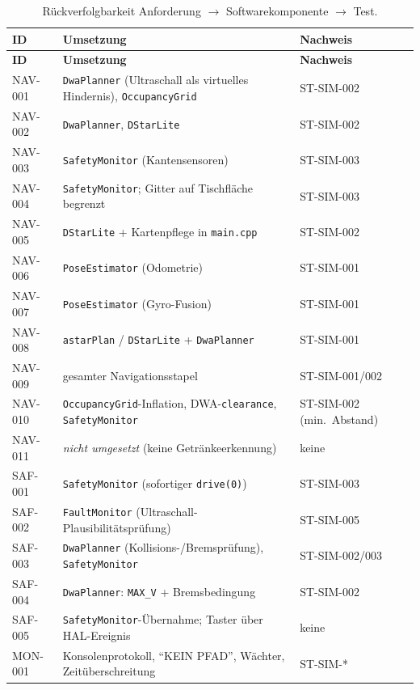 \documentclass[
  a4paper,
  12pt,
  DIV=12,        %
  parskip=half,  %
  headings=small %
]{scrartcl}
\theoremstyle{definition}
\theoremstyle{definition}
\begin{document}
\begin{longtable}[]{@{}
  >{\raggedright\arraybackslash}p{}
  >{\raggedright\arraybackslash}p{}
  >{\raggedright\arraybackslash}p{}@{}}
\caption{Rückverfolgbarkeit Anforderung $\rightarrow$ Softwarekomponente $\rightarrow$ Test.}
\label{tab:trace}\\
\toprule
\textbf{ID} & \textbf{Umsetzung} & \textbf{Nachweis}\\
\midrule
\endfirsthead
\toprule
\textbf{ID} & \textbf{Umsetzung} & \textbf{Nachweis}\\
\midrule
\endhead
\bottomrule
\endfoot
NAV-001 & \texttt{DwaPlanner} (Ultraschall als virtuelles Hindernis), \texttt{OccupancyGrid} & ST-SIM-002\\
NAV-002 & \texttt{DwaPlanner}, \texttt{DStarLite} & ST-SIM-002\\
NAV-003 & \texttt{SafetyMonitor} (Kantensensoren) & ST-SIM-003\\
NAV-004 & \texttt{SafetyMonitor}; Gitter auf Tischfläche begrenzt & ST-SIM-003\\
NAV-005 & \texttt{DStarLite} + Kartenpflege in \texttt{main.cpp} & ST-SIM-002\\
NAV-006 & \texttt{PoseEstimator} (Odometrie) & ST-SIM-001\\
NAV-007 & \texttt{PoseEstimator} (Gyro-Fusion) & ST-SIM-001\\
NAV-008 & \texttt{astarPlan} / \texttt{DStarLite} + \texttt{DwaPlanner} & ST-SIM-001\\
NAV-009 & gesamter Navigationsstapel & ST-SIM-001/002\\
NAV-010 & \texttt{OccupancyGrid}-Inflation, DWA-\texttt{clearance}, \texttt{SafetyMonitor} & ST-SIM-002 (min.\ Abstand)\\
NAV-011 & \emph{nicht umgesetzt} (keine Getränkeerkennung) & keine\\
SAF-001 & \texttt{SafetyMonitor} (sofortiger \texttt{drive(0)}) & ST-SIM-003\\
SAF-002 & \texttt{FaultMonitor} (Ultraschall-Plausibilitätsprüfung) & ST-SIM-005\\
SAF-003 & \texttt{DwaPlanner} (Kollisions-/Bremsprüfung), \texttt{SafetyMonitor} & ST-SIM-002/003\\
SAF-004 & \texttt{DwaPlanner}: \texttt{MAX\_V} + Bremsbedingung & ST-SIM-002\\
SAF-005 & \texttt{SafetyMonitor}-Übernahme; Taster über HAL-Ereignis & keine\\
MON-001 & Konsolenprotokoll, \enquote{KEIN PFAD}, Wächter, Zeitüberschreitung & ST-SIM-*\\

\end{longtable}
\end{document}
